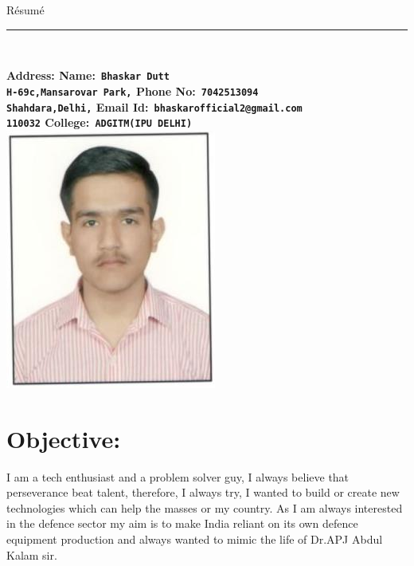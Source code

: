\documentclass[10pt]{report}
\begin{document}
	
{\huge\hspace{210pt}R\'{e}sum\'{e}}
\\{\noindent\rule{18cm}{0.8pt}\\[4pt]}
\bf Address: \hspace{258pt}\bf Name:\verb| Bhaskar Dutt|
\\
\verb"H-69c,Mansarovar Park,"  \hspace{188pt}\bf Phone No:\verb" 7042513094"
\\{\verb"Shahdara,Delhi,"}   \hspace{226pt}\bf Email Id:\verb" bhaskarofficial2@gmail.com"
\\{\verb"110032"}    \hspace{272pt}\bf College:\verb" ADGITM(IPU DELHI)" \\[1pt]
	                  

{\hspace{330pt}\includegraphics[scale =0.5]{bhaskar}\\[3pt]} %
\section*{Objective:} %
\normalfont I am a tech enthusiast and a problem solver guy, I always believe that perseverance beat talent, therefore, I always try, I wanted to build or create new technologies which can help the masses or my country. As I am always interested in the defence sector my aim is to make India reliant on its own defence equipment production and always wanted to mimic the life of Dr.APJ Abdul Kalam sir.
\end{document}
